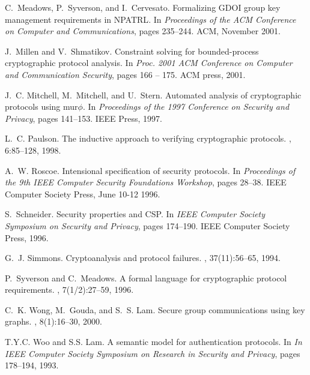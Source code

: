 \documentclass{entcs} \usepackage{entcsmacro}
\begin{document}
\begin{thebibliography}{10}
C.~Meadows, P.~Syverson, and I.~Cervesato.
\newblock Formalizing {GDOI} group key management requirements in {NPATRL}.
\newblock In {\em Proceedings of the ACM Conference on Computer and
  Communications}, pages 235--244. ACM, November 2001.

J.~Millen and V.~Shmatikov.
\newblock Constraint solving for bounded-process cryptographic protocol
  analysis.
\newblock In {\em Proc. 2001 ACM Conference on Computer and Communication
  Security}, pages 166 -- 175. ACM press, 2001.

J.~C. Mitchell, M.~Mitchell, and U.~Stern.
\newblock Automated analysis of cryptographic protocols using mur$\phi$.
\newblock In {\em Proceedings of the 1997 Conference on Security and Privacy},
  pages 141--153. IEEE Press, 1997.

L.~C. Paulson.
\newblock The inductive approach to verifying cryptographic protocols.
, 6:85--128, 1998.

A.~W. Roscoe.
\newblock Intensional specification of security protocols.
\newblock In {\em Proceedings of the 9th IEEE Computer Security Foundations
  Workshop}, pages 28--38. IEEE Computer Society Press, June 10-12 1996.

S.~Schneider.
\newblock Security properties and {CSP}.
\newblock In {\em IEEE Computer Society Symposium on Security and Privacy},
  pages 174--190. IEEE Computer Society Press, 1996.

G.~J. Simmons.
\newblock Cryptoanalysis and protocol failures.
, 37(11):56--65, 1994.

P.~Syverson and C.~Meadows.
\newblock A formal language for cryptographic protocol requirements.
, 7(1/2):27--59, 1996.

C.~K. Wong, M.~Gouda, and S.~S. Lam.
\newblock Secure group communications using key graphs.
, 8(1):16--30, 2000.

T.Y.C. Woo and S.S. Lam.
\newblock A semantic model for authentication protocols.
\newblock In {\em In IEEE Computer Society Symposium on Research in Security
  and Privacy}, pages 178--194, 1993.

\end{thebibliography}
\end{document}
